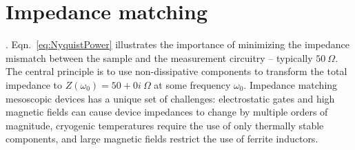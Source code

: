 \section{Impedance matching}\label{section:matching}
. Eqn.~\ref{eq:NyquistPower} illustrates the importance of minimizing the impedance mismatch between the sample and the measurement circuitry -- typically $50~\Omega$. The central principle is to use non-dissipative components to transform the total impedance to $Z(\omega_0) = 50+0i~\Omega$ at some frequency $\omega_0$. Impedance matching mesoscopic devices has a unique set of challenges: electrostatic gates and high magnetic fields can cause device impedances to change by multiple orders of magnitude, cryogenic temperatures require the use of only thermally stable components, and large magnetic fields restrict the use of ferrite inductors.


